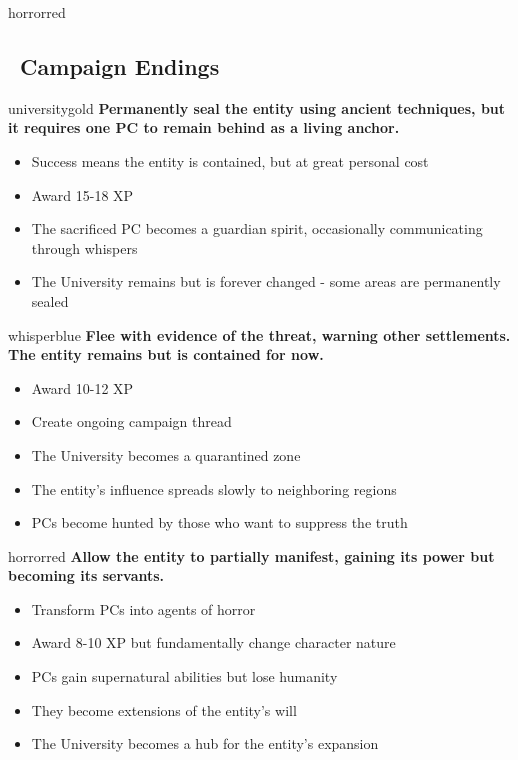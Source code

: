 \documentclass[11pt]{article}
\begin{document}
\begin{campaignsection}{horrorred}
\subsection*{\faDoorOpen\ Campaign Endings}

\begin{clockbox}{universitygold}
\textbf{Permanently seal the entity using ancient techniques, but it requires one PC to remain behind as a living anchor.}
\begin{itemize}
    \item Success means the entity is contained, but at great personal cost
    \item Award 15-18 XP
    \item The sacrificed PC becomes a guardian spirit, occasionally communicating through whispers
    \item The University remains but is forever changed - some areas are permanently sealed
\end{itemize}
\end{clockbox}

\begin{clockbox}{whisperblue}
\textbf{Flee with evidence of the threat, warning other settlements. The entity remains but is contained for now.}
\begin{itemize}
    \item Award 10-12 XP
    \item Create ongoing campaign thread
    \item The University becomes a quarantined zone
    \item The entity's influence spreads slowly to neighboring regions
    \item PCs become hunted by those who want to suppress the truth
\end{itemize}
\end{clockbox}

\begin{clockbox}{horrorred}
\textbf{Allow the entity to partially manifest, gaining its power but becoming its servants.}
\begin{itemize}
    \item Transform PCs into agents of horror
    \item Award 8-10 XP but fundamentally change character nature
    \item PCs gain supernatural abilities but lose humanity
    \item They become extensions of the entity's will
    \item The University becomes a hub for the entity's expansion
\end{itemize}
\end{clockbox}


\end{campaignsection}
\end{document}
